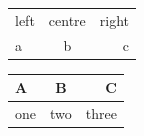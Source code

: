 \documentclass{article}
\begin{document}
\begin{tabular}{lcr}
left & centre & right \\
a & b & c \\
\end{tabular}

\begin{tabular}{|l|c|r|}
\hline
A & B & C \\
\hline
one & two & three \\
\hline
\end{tabular}
\end{document}
